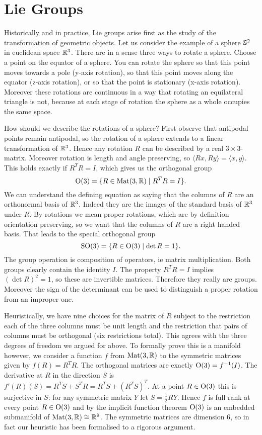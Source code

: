 \chapter{Lie Groups}

Historically and in practice, Lie groups arise first as the study of the transformation of geometric objects.
Let us consider the example of a sphere $\mathbb{S}^2$ in euclidean space $\mathbb{R}^3$.
There are in a sense three ways to rotate a sphere.
Choose a point on the equator of a sphere.
You can rotate the sphere so that this point moves towards a pole (y-axis rotation), so that this point moves along the equator (z-axis rotation), or so that the point is stationary (x-axis rotation).
Moreover these rotations are continuous in a way that rotating an equilateral triangle is not, because at each stage of rotation the sphere as a whole occupies the same space.

How should we describe the rotations of a sphere?
First observe that antipodal points remain antipodal, so the rotation of a sphere extends to a linear transformation of $\mathbb{R}^3$.
Hence any rotation $R$ can be described by a real $3\times 3$-matrix.
Moreover rotation is length and angle preserving, so $\langle Rx, Ry \rangle = \langle x, y \rangle$.
This holds exactly if $R^TR = I$, which gives us the orthogonal group
\[
\mathrm{O}(3) = \{ R \in \operatorname{Mat}(3,\mathbb{R}) \mid R^TR = I \}.
\]
We can understand the defining equation as saying that the columns of $R$ are an orthonormal basis of $\mathbb{R}^3$.
Indeed they are the images of the standard basis of $\mathbb{R}^3$ under $R$.
By rotations we mean proper rotations, which are by definition orientation preserving, so we want that the columns of $R$ are a right handed basis.
That leads to the special orthogonal group
\[
\mathrm{SO}(3) = \{ R \in \mathrm{O}(3) \mid \det R = 1 \}.
\]
The group operation is composition of operators, ie matrix multiplication.
Both groups clearly contain the identity $I$.
The property $R^T R = I$ implies $(\det R)^2 = 1$, so these are invertible matrices.
Therefore they really are groups.
Moreover the sign of the determinant can be used to distinguish a proper rotation from an improper one.

Heuristically, we have nine choices for the matrix of $R$ subject to the restriction each of the three columns must be unit length and the restriction that pairs of columns must be orthogonal (six restrictions total).
This agrees with the three degrees of freedom we argued for above.
To formally prove this is a manifold however, we consider a function $f$ from $\operatorname{Mat}(3,\mathbb{R})$ to the symmetric matrices given by $f(R) = R^TR$.
The orthogonal matrices are exactly $\mathrm{O}(3) = f^{-1}(I)$.
The derivative at $R$ in the direction $S$ is $f'(R)(S) = R^TS + S^T R = R^T S + (R^T S)^T$.
At a point $R \in \mathrm{O}(3)$ this is surjective in $S$: for any symmetric matrix $Y$ let $S = \frac{1}{2}RY$.
Hence $f$ is full rank at every point $R \in \mathrm{O}(3)$ and by the implicit function theorem $\mathrm{O}(3)$ is an embedded submanifold of $\operatorname{Mat}(3,\mathbb{R}) \cong \mathbb{R}^9$.
The symmetric matrices are dimension $6$, so in fact our heuristic has been formalised to a rigorous argument.

